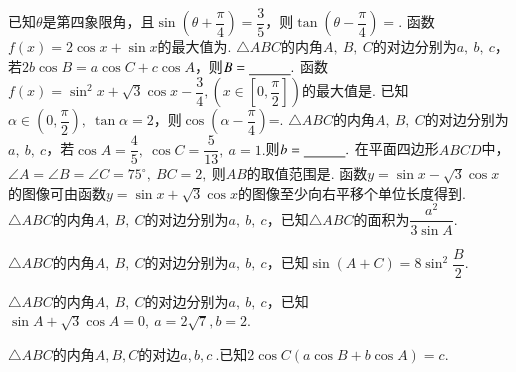 \documentclass{BHCexam}
\begin{document}
\begin{questions}
	\qs 已知$ \theta $是第四象限角，且$\sin\left(\theta+\dfrac{\pi}{4}\right)=\dfrac{3}{5} $，则$ \tan\left(\theta-\dfrac{\pi}{4}\right)= $\tk.
	\qs 函数$f(x)=2\cos x+\sin x$的最大值为\tk.
	\qs $\triangle ABC$的内角$ A,\ B,\ C $的对边分别为$ a,~b,~c $，若$ 2b\cos B=a\cos C+c\cos A $，则$ B=\underline{\hspace{3em}}. $
	\qs 函数$f(x)=\sin ^2x +\sqrt{3}\cos x-\dfrac{3}{4}, \left(x\in \left[0,\dfrac{\pi}{2}\right]\right)$的最大值是\tk.
	\qs 已知$ \alpha\in\left(0,\dfrac{\pi}{2}\right),~\tan\alpha=2 $，则$ \cos\left(\alpha-\dfrac{\pi}{4} \right)$=\tk.
	\qs $\triangle ABC$的内角$ A,~B,~C $的对边分别为$ a,~b,~c $，若$ \cos A=\dfrac{4}{5} ,~\cos C=\dfrac{5}{13},~a=1.$则$ b=\underline{\hspace{3em}}. $
	\question 在平面四边形$ABCD$中，$\angle A=\angle B=\angle C=75^{\circ},~$$ BC=2,~ $则$AB$的取值范围是\tk.
	\qs 函数$ y=\sin x-\sqrt{3}\cos x $的图像可由函数$ y=\sin x+\sqrt{3}\cos x $的图像至少向右平移\tk 个单位长度得到.
	\qs $\triangle ABC$的内角$ A,~B,~C $的对边分别为$ a,~b,~c $，已知$\triangle ABC$的面积为$\dfrac{a^2}{3\sin A}$.
 \qs $\triangle ABC$的内角$ A,~B,~C $的对边分别为$ a,~b,~c $，已知$ \sin\left(A+C\right)=8\sin^2\dfrac{B}{2} .$
\qs $\triangle ABC$的内角$ A,~B,~C $的对边分别为$ a,~b,~c $，已知$ \sin A+\sqrt{3}\cos A=0,~a=2\sqrt{7},b=2 $.
\qs $\triangle ABC$的内角$ A,B,C $的对边$ a,b,c ~$.已知$ 2\cos C(a\cos B +b \cos A)=c $.
\begin{parts}

\end{parts}
\end{questions}
\end{document}
